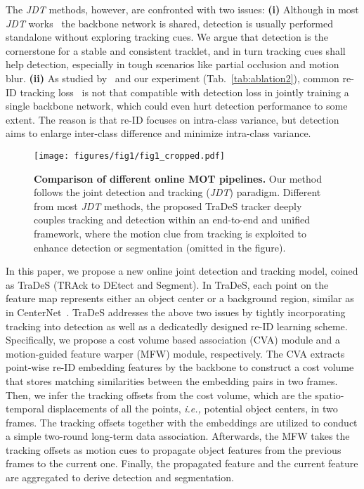 \documentclass[final]{cvpr}
\begin{document}
The \emph{JDT} methods, however, are confronted with two issues: \textbf{(i)} Although in most \emph{JDT} works~\cite{CTacker,wang2019towards,lu2020retinatrack,wu2020temporal} the backbone network is shared, detection is usually performed standalone without exploring tracking cues. We argue that detection is the cornerstone for a stable and consistent tracklet, and in turn tracking cues shall help detection, especially in tough scenarios like partial occlusion and motion blur.  \textbf{(ii)} As studied by~\cite{chen2018person} and our experiment (Tab.~\ref{tab:ablation2}), common re-ID tracking loss~\cite{wang2019towards,lu2020retinatrack,schroff2015facenet,xiao2017joint} is not that compatible with detection loss in jointly training a single backbone network, which could even hurt detection performance to some extent. The reason is that re-ID focuses on intra-class variance, but detection aims to enlarge inter-class difference and minimize intra-class variance. 

\begin{figure}
	\centering
	\texttt{[image: figures/fig1/fig1\_cropped.pdf]}
	\caption{\textbf{Comparison of different online MOT pipelines.} Our method follows the joint detection and tracking (\emph{JDT}) paradigm. Different from most \emph{JDT} methods, the proposed TraDeS tracker deeply couples tracking and detection within an end-to-end and unified framework, where the motion clue from tracking is exploited to enhance detection or segmentation (omitted in the figure).}
	\label{fig:fig1}
	\vspace{-2mm}
\end{figure}

In this paper, we propose a new online joint detection and tracking model, coined as TraDeS (TRAck to DEtect and Segment). In TraDeS, each point on the feature map represents either an object center or a background region, similar as in CenterNet~\cite{zhou2019objects}. TraDeS addresses the above two issues by tightly incorporating tracking into detection as well as a dedicatedly designed re-ID learning scheme. Specifically, we propose a cost volume based association (CVA) module and a motion-guided feature warper (MFW) module, respectively. The CVA extracts point-wise re-ID embedding features by the backbone to construct a cost volume that stores matching similarities between the embedding pairs in two frames. Then, we infer the tracking offsets from the cost volume, which are the spatio-temporal displacements of all the points, \emph{i.e.,} potential object centers, in two frames. The tracking offsets together with the embeddings are utilized to conduct a simple two-round long-term data association. Afterwards, the MFW takes the tracking offsets as motion cues to propagate object features from the previous frames to the current one. Finally, the propagated feature and the current feature are aggregated to derive detection and segmentation.
\end{document}
